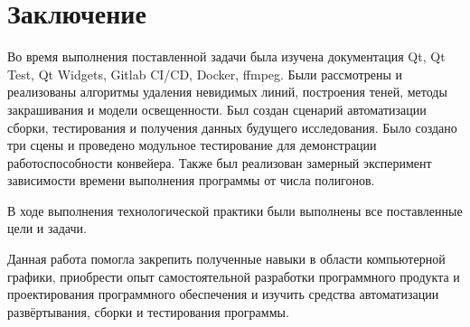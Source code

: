 \documentclass[a4paper,14pt]{extreport}
\begin{document}
\chapter*{Заключение}
Во время выполнения поставленной задачи была изучена документация Qt, Qt Test, Qt Widgets, Gitlab CI/CD, Docker, ffmpeg. Были рассмотрены и
реализованы алгоритмы удаления невидимых линий,
построения теней, методы закрашивания и модели освещенности. Был создан сценарий автоматизации сборки, тестирования и 
получения данных будущего исследования. Было создано три сцены и проведено 
модульное тестирование для демонстрации работоспособности конвейера.
Также был реализован замерный эксперимент зависимости времени выполнения 
программы от числа полигонов.
\par В ходе выполнения технологической практики были выполнены все 
поставленные цели и задачи.
\par Данная работа помогла закрепить полученные навыки в области 
компьютерной графики, приобрести опыт самостоятельной разработки 
программного продукта и проектирования программного обеспечения и изучить 
средства автоматизации развёртывания, сборки и тестирования программы.
\end{document}
